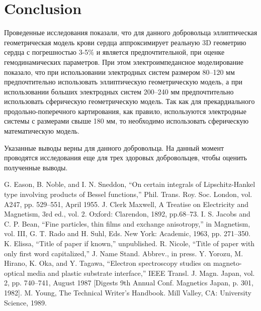 \documentclass[conference]{IEEEtran}
\begin{document}
\section{Conclusion}

Проведенные исследования показали, что для данного добровольца эллиптическая геометрическая модель крови сердца аппроксимирует реальную 3D геометрию сердца с погрешностью 3-5\% и является предпочтительной, при оценке гемодинамических параметров.
При этом электроимпедансное моделирование показало, что при использовании электродных систем размером 80--120 мм предпочтительно использовать эллиптическую геометрическую модель, а при использовании больших электродных систем 200--240 мм предпочтительно использовать сферическую геометрическую модель.
Так как для прекардиального продольно-поперечного картирования, как правило, используются электродные системы с размерами свыше 180 мм, то необходимо использовать сферическую математическую модель.

Указанные выводы верны для данного добровольца. На данный момент проводятся исследования еще для трех здоровых добровольцев, чтобы оценить полученные выводы.

\begin{thebibliography}{00}
 G. Eason, B. Noble, and I. N. Sneddon, ``On certain integrals of Lipschitz-Hankel type involving products of Bessel functions,'' Phil. Trans. Roy. Soc. London, vol. A247, pp. 529--551, April 1955.
 J. Clerk Maxwell, A Treatise on Electricity and Magnetism, 3rd ed., vol. 2. Oxford: Clarendon, 1892, pp.68--73.
 I. S. Jacobs and C. P. Bean, ``Fine particles, thin films and exchange anisotropy,'' in Magnetism, vol. III, G. T. Rado and H. Suhl, Eds. New York: Academic, 1963, pp. 271--350.
 K. Elissa, ``Title of paper if known,'' unpublished.
 R. Nicole, ``Title of paper with only first word capitalized,'' J. Name Stand. Abbrev., in press.
 Y. Yorozu, M. Hirano, K. Oka, and Y. Tagawa, ``Electron spectroscopy studies on magneto-optical media and plastic substrate interface,'' IEEE Transl. J. Magn. Japan, vol. 2, pp. 740--741, August 1987 [Digests 9th Annual Conf. Magnetics Japan, p. 301, 1982].
 M. Young, The Technical Writer's Handbook. Mill Valley, CA: University Science, 1989.
\end{thebibliography}
\vspace{12pt}
\end{document}
